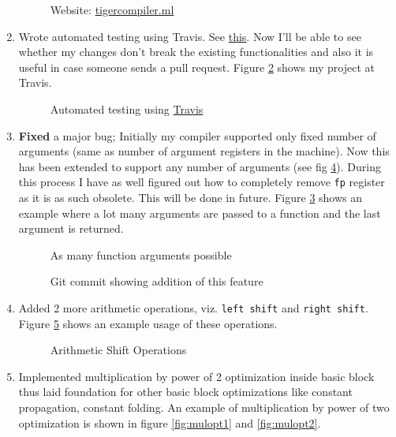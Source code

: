 \begin{enumerate}
    \begin{figure}
    \centering
    \caption{Website: \href{https://tigercompiler.ml}{tigercompiler.ml}}
    \label{fig:tigercompiler}
    \end{figure}
  \item Wrote automated testing using Travis. See \href{https://travis-ci.org/sourabh2311/btp}{this}. Now I'll be able to see whether my changes don't break the existing functionalities and also it is useful in case someone sends a pull request. Figure \ref{fig:travis} shows my project at Travis.
    \begin{figure}
    \centering
    \caption{Automated testing using \href{https://travis-ci.org/sourabh2311/btp}{Travis}}
    \label{fig:travis}
    \end{figure}
  \item \textbf{Fixed} a major bug; Initially my compiler supported only fixed number of arguments (same as number of argument registers in the machine). Now this has been extended to support any number of arguments (see fig \ref{fig:gitfunargs}). During this process I have as well figured out how to completely remove \texttt{fp} register as it is as such obsolete. This will be done in future. Figure \ref{fig:funargs} shows an example where a lot many arguments are passed to a function and the last argument is returned.   
    \begin{figure}
    \centering
    \caption{As many function arguments possible}
    \label{fig:funargs}
    \end{figure}
    \begin{figure}
    \centering
    \caption{Git commit showing addition of this feature}
    \label{fig:gitfunargs}
    \end{figure}
  \item Added 2 more arithmetic operations, viz. \texttt{left shift} and \texttt{right shift}. Figure \ref{fig:shiftoperations} shows an example usage of these operations.
    \begin{figure}
    \centering
    \caption{Arithmetic Shift Operations}
    \label{fig:shiftoperations}
    \end{figure}
  \item Implemented multiplication by power of 2 optimization inside basic block thus laid foundation for other basic block optimizations like constant propagation, constant folding. An example of multiplication by power of two optimization is shown in figure \ref{fig:mulopt1} and \ref{fig:mulopt2}.

\end{enumerate}
